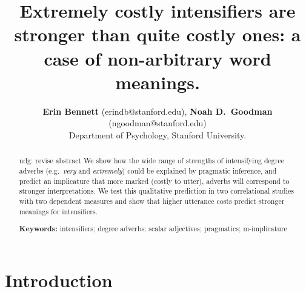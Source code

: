 \documentclass[10pt,letterpaper]{article}
\title{Extremely costly intensifiers are stronger than quite costly ones: a case of non-arbitrary word meanings.}
\author{{\large \bf Erin Bennett} (erindb@stanford.edu), {\large \bf Noah D.~Goodman} (ngoodman@stanford.edu)\\
  Department of Psychology, Stanford University.}
\newcommand{\w}[1]{\emph{#1}}
\newcommand{\todo}[1]{{\color{red}#1}}
\begin{document}
\maketitle

\begin{abstract}

\todo{ndg: revise abstract}
We show how the wide range of strengths of intensifying degree adverbs (e.g.~\w{very} and \w{extremely}) could be explained by pragmatic inference, and predict an implicature that more marked (costly to utter), adverbs will correspond to stronger interpretations. We test this qualitative prediction in two correlational studies with two dependent measures and show that higher utterance costs predict stronger meanings for intensifiers.

\textbf{Keywords:} 
intensifiers; degree adverbs; scalar adjectives; pragmatics; m-implicature
\end{abstract}

\section{Introduction}
\end{document}
